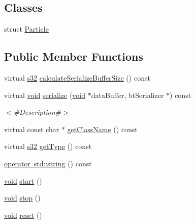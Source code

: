 \subsection*{Classes}
\begin{DoxyCompactItemize}
\item 
struct \mbox{\hyperlink{structnjli_1_1_particle_emitter_1_1_particle}{Particle}}
\end{DoxyCompactItemize}
\subsection*{Public Member Functions}
\begin{DoxyCompactItemize}
\item 
virtual \mbox{\hyperlink{_util_8h_aa62c75d314a0d1f37f79c4b73b2292e2}{s32}} \mbox{\hyperlink{classnjli_1_1_particle_emitter_a40f59eab6df7068b7f8492b3eab2ad8e}{calculate\+Serialize\+Buffer\+Size}} () const
\item 
virtual \mbox{\hyperlink{_thread_8h_af1e856da2e658414cb2456cb6f7ebc66}{void}} \mbox{\hyperlink{classnjli_1_1_particle_emitter_a041d9903cc7d37f572a3cf78c3d5120b}{serialize}} (\mbox{\hyperlink{_thread_8h_af1e856da2e658414cb2456cb6f7ebc66}{void}} $\ast$data\+Buffer, bt\+Serializer $\ast$) const
\begin{DoxyCompactList}\small\item\em $<$\#\+Description\#$>$ \end{DoxyCompactList}\item 
virtual const char $\ast$ \mbox{\hyperlink{classnjli_1_1_particle_emitter_a8af19928b42197049a6495eeae5efd67}{get\+Class\+Name}} () const
\item 
virtual \mbox{\hyperlink{_util_8h_aa62c75d314a0d1f37f79c4b73b2292e2}{s32}} \mbox{\hyperlink{classnjli_1_1_particle_emitter_ac619dadb63ed938e13c11e3ee8b9ae6f}{get\+Type}} () const
\item 
\mbox{\hyperlink{classnjli_1_1_particle_emitter_af8afe71631de5be2f6cdd39688f12581}{operator std\+::string}} () const
\item 
\mbox{\hyperlink{_thread_8h_af1e856da2e658414cb2456cb6f7ebc66}{void}} \mbox{\hyperlink{classnjli_1_1_particle_emitter_aed77fee123512b6c75b019defbdcaacd}{start}} ()
\item 
\mbox{\hyperlink{_thread_8h_af1e856da2e658414cb2456cb6f7ebc66}{void}} \mbox{\hyperlink{classnjli_1_1_particle_emitter_a45a3c77c2299042082d3dfd0d69a8bb1}{stop}} ()
\item 
\mbox{\hyperlink{_thread_8h_af1e856da2e658414cb2456cb6f7ebc66}{void}} \mbox{\hyperlink{classnjli_1_1_particle_emitter_aa4d2915815495c85fb349da5e33dd1a3}{reset}} ()

\end{DoxyCompactItemize}
